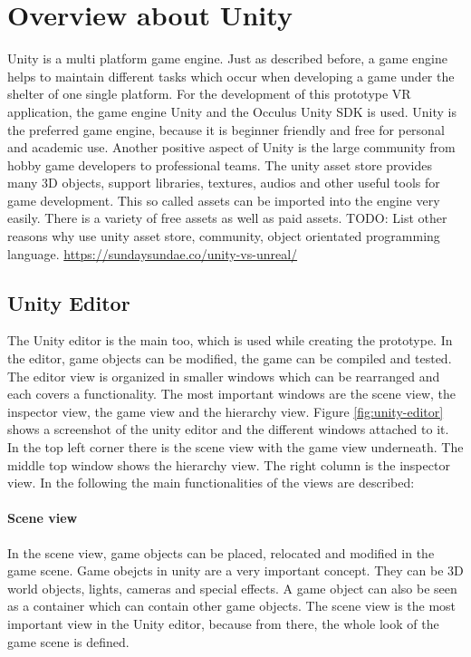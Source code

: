 \section{Overview about Unity}
Unity is a multi platform game engine. Just as described before, a game engine helps to maintain different tasks which occur when developing a game under the shelter of one single platform. 
For the development of this prototype VR application, the game engine Unity and the Occulus Unity SDK is used. Unity is the preferred game engine, because it is beginner friendly and free for personal and academic use. Another positive aspect of Unity is the large community from hobby game developers to professional teams. The unity asset store provides many 3D objects, support libraries, textures, audios and other useful tools for game development. This so called assets can be imported into the engine very easily. There is a variety of free assets as well as paid assets. TODO: List other reasons why use unity asset store, community, object orientated programming language. \url{https://sundaysundae.co/unity-vs-unreal/}\\
\subsection{Unity Editor}
The Unity editor is the main too, which is used while creating the prototype. In the editor, game objects can be modified, the game can be compiled and tested. The editor view is organized in smaller windows which can be rearranged and each covers a functionality. The most important windows are the scene view, the inspector view, the game view and the hierarchy view. Figure \ref{fig:unity-editor} shows a screenshot of the unity editor and the different windows attached to it. In the top left corner there is the scene view with the game view underneath. The middle top window shows the hierarchy view. The right column is the inspector view. In the following the main functionalities of the views are described:
\paragraph{Scene view}
In the scene view, game objects can be placed, relocated and modified in the game scene. Game obejcts in unity are a very important concept. They can be 3D world objects, lights, cameras and special effects. A game object can also be seen as a container which can contain other game objects. The scene view is the most important view in the Unity editor, because from there, the whole look of the game scene is defined.

